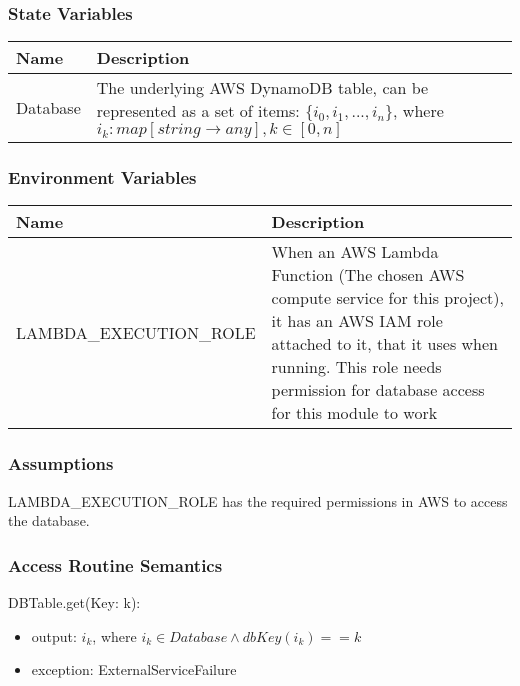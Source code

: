 \documentclass[12pt, titlepage]{article}
\begin{document}
\subsubsection{State Variables}

\begin{center}
  \begin{tabular}{p{4cm} p{12cm}}
    \hline
    \textbf{Name} & \textbf{Description} \\
    \hline
    Database & The underlying AWS DynamoDB table, can be represented
    as a set of items: $\{i_0, i_1, ..., i_n\}$, where $i_k:
    map[string \rightarrow  any], k\in[0,n]$ \\
    \hline
  \end{tabular}
\end{center}

\subsubsection{Environment Variables}

\begin{center}
  \begin{tabular}{p{6cm} p{10cm}}
    \hline
    \textbf{Name} & \textbf{Description} \\
    \hline
    LAMBDA\_EXECUTION\_ROLE & When an AWS Lambda Function (The chosen
    AWS compute service for this project), it has an AWS IAM role
    attached to it, that it uses when running. This role needs
    permission for database access for this module to work \\
    \hline
  \end{tabular}
\end{center}

\subsubsection{Assumptions}

LAMBDA\_EXECUTION\_ROLE has the required permissions in AWS to access
the database.

\subsubsection{Access Routine Semantics}

\noindent DBTable.get(Key: k):
\begin{itemize}
  \item output: $i_k$, where $i_k \in Database \land dbKey(i_k) == k$
  \item exception: ExternalServiceFailure
\end{itemize}
\end{document}
